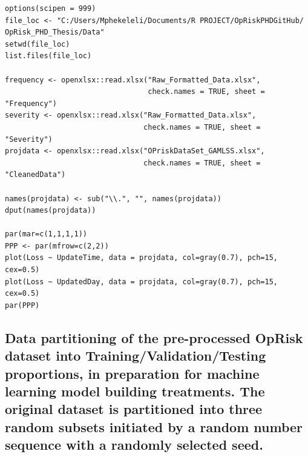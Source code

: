 \documentclass{DissertateUSU}
\begin{document}
\begin{verbatim}
options(scipen = 999)
file_loc <- "C:/Users/Mphekeleli/Documents/R PROJECT/OpRiskPHDGitHub/
OpRisk_PHD_Thesis/Data"
setwd(file_loc)
list.files(file_loc)

frequency <- openxlsx::read.xlsx("Raw_Formatted_Data.xlsx",
                                 check.names = TRUE, sheet = "Frequency")
severity <- openxlsx::read.xlsx("Raw_Formatted_Data.xlsx",
                                check.names = TRUE, sheet = "Severity")
projdata <- openxlsx::read.xlsx("OPriskDataSet_GAMLSS.xlsx",
                                check.names = TRUE, sheet = "CleanedData")

names(projdata) <- sub("\\.", "", names(projdata))
dput(names(projdata))

par(mar=c(1,1,1,1))
PPP <- par(mfrow=c(2,2))
plot(Loss ~ UpdateTime, data = projdata, col=gray(0.7), pch=15, cex=0.5)
plot(Loss ~ UpdatedDay, data = projdata, col=gray(0.7), pch=15, cex=0.5)
par(PPP)
\end{verbatim}

\normalsize

\subsection{Data partitioning of the pre-processed OpRisk dataset into Training/Validation/Testing proportions, in preparation for machine learning model building treatments. The original dataset is partitioned into three random subsets initiated by a random number sequence with a randomly selected seed.}
\label{ssec:GAMLSS Data Training/Validation/Testing}

\small
\end{document}
